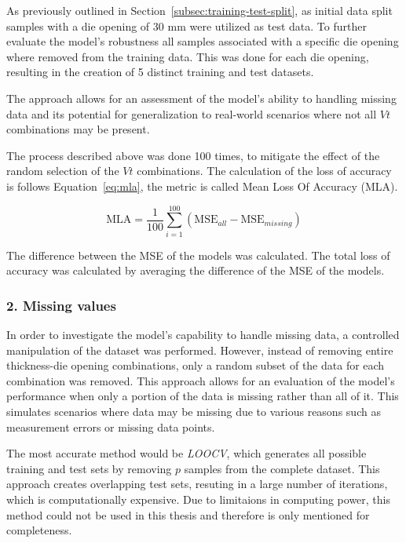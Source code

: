 As previously outlined in Section~\ref{subsec:training-test-split}, as initial data split samples
with a die opening of 30 mm were utilized as test data.
To further evaluate the model's robustness all samples associated with a specific die opening
where removed from the training data.
This was done for each die opening, resulting in the creation of 5 distinct training and test datasets.

The approach allows for an assessment of the model's ability to handling missing data and its
potential for generalization to real-world scenarios where not all $Vt$ combinations may be
present.

The process described above was done 100 times, to mitigate the effect of the random selection of
the $Vt$ combinations.
The calculation of the loss of accuracy is follows Equation~\ref{eq:mla}, the metric is called
Mean Loss Of Accuracy (\ac{MLA}).

\begin{tcolorbox}[arc=0pt,boxrule=0.5pt]
    \begin{equation}
        \label{eq:mla}
        \text{MLA} = \frac{1}{100} \sum_{i=1}^{100} \left( \text{MSE}_{all} - \text{MSE}_{missing}
        \right)
    \end{equation}
\end{tcolorbox}

The difference between the \ac{MSE} of the models was calculated.
The total loss of accuracy was calculated by averaging the difference of the \ac{MSE} of the models.

\subsubsection*{2. Missing values}

In order to investigate the model's capability to handle missing data, a controlled manipulation
of the dataset was performed.
However, instead of removing entire thickness-die opening combinations, only a random subset of
the data for each combination was removed.
This approach allows for an evaluation of the model's performance when only a portion of the data
is missing rather than all of it.
This simulates scenarios where data may be missing due to various reasons such as measurement
errors or missing data points.

The most accurate method would be \textit{LOOCV}, which generates all possible training and test
sets by removing $p$ samples from the complete dataset.
This approach creates overlapping test sets, resuting in a large number of iterations, which is
computationally expensive.
Due to limitaions in computing power, this method could not be used in this thesis and therefore
is only mentioned for completeness.

